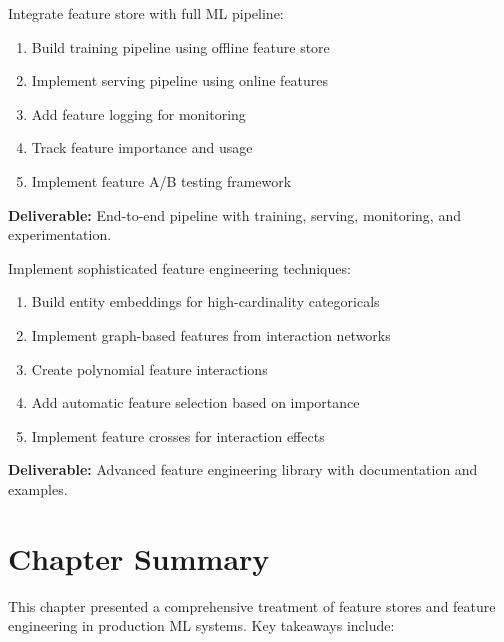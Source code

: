 \begin{exercise}
Integrate feature store with full ML pipeline:
\begin{enumerate}
    \item Build training pipeline using offline feature store
    \item Implement serving pipeline using online features
    \item Add feature logging for monitoring
    \item Track feature importance and usage
    \item Implement feature A/B testing framework
\end{enumerate}
\textbf{Deliverable:} End-to-end pipeline with training, serving, monitoring, and experimentation.
\end{exercise}

\begin{exercise}
Implement sophisticated feature engineering techniques:
\begin{enumerate}
    \item Build entity embeddings for high-cardinality categoricals
    \item Implement graph-based features from interaction networks
    \item Create polynomial feature interactions
    \item Add automatic feature selection based on importance
    \item Implement feature crosses for interaction effects
\end{enumerate}
\textbf{Deliverable:} Advanced feature engineering library with documentation and examples.
\end{exercise}

\section{Chapter Summary}

This chapter presented a comprehensive treatment of feature stores and feature engineering in production ML systems. Key takeaways include:

